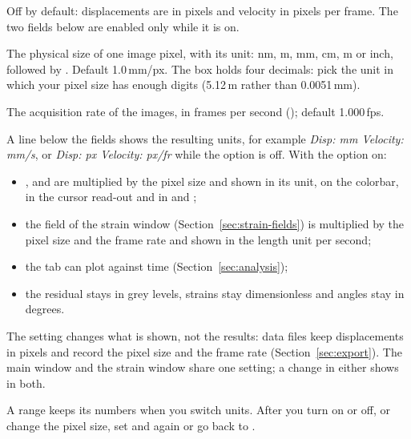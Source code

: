 \begin{description}[leftmargin=1.2cm,style=nextline]
  \item[Use physical units]
    Off by default: displacements are in pixels and velocity in pixels per frame. The two
    fields below are enabled only while it is on.
  \item[Pixel size]
    The physical size of one image pixel, with its unit: nm, \textmu m, mm, cm, m or inch,
    followed by . Default 1.0\,mm/px. The box holds four decimals: pick the unit in which
    your pixel size has enough digits (5.12\,\textmu m rather than 0.0051\,mm).
  \item[Frame rate]
    The acquisition rate of the images, in frames per second (); default 1.000\,fps.
\end{description}

A line below the fields shows the resulting units, for example \emph{Disp: mm Velocity: mm/s},
or \emph{Disp: px Velocity: px/fr} while the option is off. With the option on:

\begin{itemize}
  \item {},  and  are multiplied by the pixel size and shown
        in its unit, on the colorbar, in the cursor read-out and in  and ;
  \item the  field of the strain window (Section~\ref{sec:strain-fields}) is
        multiplied by the pixel size and the frame rate and shown in the length unit per second;
  \item the  tab can plot against time (Section~\ref{sec:analysis});
  \item the residual stays in grey levels, strains stay dimensionless and angles stay in
        degrees.
\end{itemize}

The setting changes what is shown, not the results: data files keep displacements in pixels and
record the pixel size and the frame rate (Section~\ref{sec:export}). The main window and the
strain window share one setting; a change in either shows in both.

\begin{notebox}
A  range keeps its numbers when you switch units. After you turn  on or off, or change the pixel size, set  and  again or go back to
.
\end{notebox}

